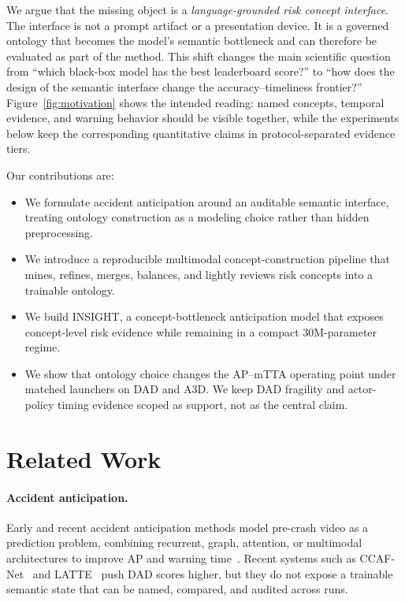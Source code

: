 \documentclass[11pt]{article}
\newcommand{\method}{\textsc{INSIGHT}}
\begin{document}
We argue that the missing object is a \emph{language-grounded risk concept
interface}. The interface is not a prompt artifact or a presentation device. It
is a governed ontology that becomes the model's semantic bottleneck and can
therefore be evaluated as part of the method. This shift changes the main
scientific question from ``which black-box model has the best leaderboard
score?'' to ``how does the design of the semantic interface change the
accuracy--timeliness frontier?'' Figure~\ref{fig:motivation} shows the intended
reading: named concepts, temporal evidence, and warning behavior should be
visible together, while the experiments below keep the corresponding
quantitative claims in protocol-separated evidence tiers.

Our contributions are:
\begin{itemize}
  \item We formulate accident anticipation around an auditable semantic
  interface, treating ontology construction as a modeling choice rather than
  hidden preprocessing.
  \item We introduce a reproducible multimodal concept-construction pipeline
  that mines, refines, merges, balances, and lightly reviews risk concepts into
  a trainable ontology.
  \item We build \method{}, a concept-bottleneck anticipation model that exposes
  concept-level risk evidence while remaining in a compact 30M-parameter regime.
  \item We show that ontology choice changes the AP--mTTA operating point under
  matched launchers on DAD and A3D. We keep DAD fragility and actor-policy
  timing evidence scoped as support, not as the central claim.
\end{itemize}

\section{Related Work}

\paragraph{Accident anticipation.}
Early and recent accident anticipation methods model pre-crash video as a
prediction problem, combining recurrent, graph, attention, or multimodal
architectures to improve AP and warning time~\citep{ref4,ref17,ref32,liao2024crash}.
Recent systems such as CCAF-Net~\citep{liu2025ccaf} and
LATTE~\citep{ZHANG2025103173} push DAD scores higher, but they do not expose a
trainable semantic state that can be named, compared, and audited across runs.
\end{document}
